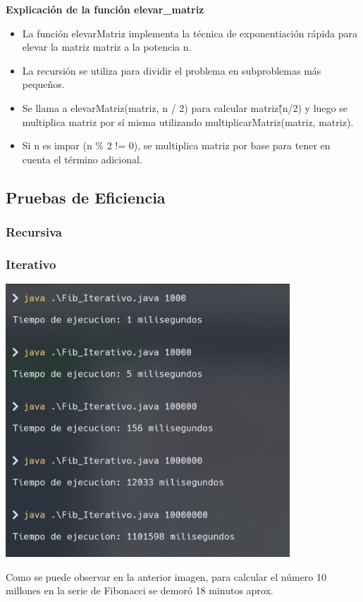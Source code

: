 \documentclass{article}
\begin{document}
            \textbf{Explicación de la función elevar\_matriz}\par  
            \begin{itemize}
                \item {La función elevarMatriz implementa la técnica de exponentiación rápida para elevar la matriz matriz a la potencia n.}
                \item {La recursión se utiliza para dividir el problema en subproblemas más pequeños.}
                \item {Se llama a elevarMatriz(matriz, n \// 2) para calcular matriz\^(n\//2) y luego se multiplica matriz por sí misma utilizando multiplicarMatriz(matriz, matriz).}
                \item {Si n es impar (n \% 2 != 0), se multiplica matriz por base para tener en cuenta el término adicional.}
            \end{itemize}
        
        \subsection{Pruebas de Eficiencia}
            \subsubsection{Recursiva}
            
            \subsubsection{Iterativo}
            \begin{center}
                \includegraphics[width=0.8\textwidth]{img/tmp_iterativo.png}
            \end{center}
            Como se puede observar en la anterior imagen, para calcular el número 10 millones en la serie de Fibonacci se demoró 18 minutos aprox. 
\end{document}

